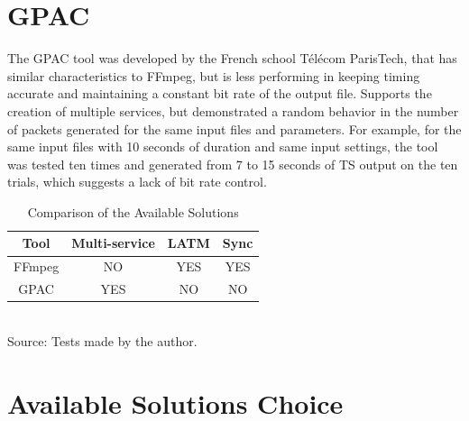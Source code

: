 \documentclass[
	12pt,				%
	openright,			%
	twoside,			%
	a4paper,			%
	brazil,
	french,				%
	english
	]{abntex2}
\begin{document}
\section{GPAC}

The GPAC tool was developed by the French school Télécom ParisTech, that has similar characteristics to FFmpeg, but is less performing in keeping timing accurate and maintaining a constant bit rate of the output file. Supports the creation of multiple services, but demonstrated a random behavior in the number of packets generated for the same input files and parameters. For example, for the same input files with 10 seconds of duration and same input settings, the tool was tested ten times and generated from 7 to 15 seconds of TS output on the ten trials, which suggests a lack of bit rate control.

\begin{table}[!htpd]
\caption{Comparison of the Available Solutions}
\begin{center}
\begin{tabular}{|c|c|c|c|}
\hline
Tool & Multi-service & LATM & Sync\\
\hline
FFmpeg & NO & YES & YES\\
\hline
GPAC & YES & NO & NO\\
\hline
\end{tabular}
\label{tab_comparison_tools}
\\Source: Tests made by the author.
\end{center}
\end{table}

\section{Available Solutions Choice}
\end{document}
